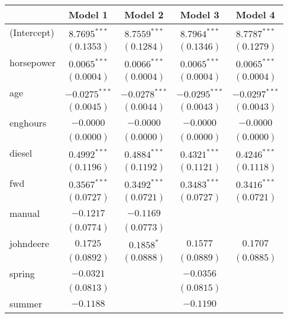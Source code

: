 
\begin{table}
\begin{center}
\begin{tabular}{l c c c c}
\hline
 & Model 1 & Model 2 & Model 3 & Model 4 \\
\hline
(Intercept) & $8.7695^{***}$  & $8.7559^{***}$  & $8.7964^{***}$  & $8.7787^{***}$  \\
            & $(0.1353)$      & $(0.1284)$      & $(0.1346)$      & $(0.1279)$      \\
horsepower  & $0.0065^{***}$  & $0.0066^{***}$  & $0.0065^{***}$  & $0.0065^{***}$  \\
            & $(0.0004)$      & $(0.0004)$      & $(0.0004)$      & $(0.0004)$      \\
age         & $-0.0275^{***}$ & $-0.0278^{***}$ & $-0.0295^{***}$ & $-0.0297^{***}$ \\
            & $(0.0045)$      & $(0.0044)$      & $(0.0043)$      & $(0.0043)$      \\
enghours    & $-0.0000$       & $-0.0000$       & $-0.0000$       & $-0.0000$       \\
            & $(0.0000)$      & $(0.0000)$      & $(0.0000)$      & $(0.0000)$      \\
diesel      & $0.4992^{***}$  & $0.4884^{***}$  & $0.4321^{***}$  & $0.4246^{***}$  \\
            & $(0.1196)$      & $(0.1192)$      & $(0.1121)$      & $(0.1118)$      \\
fwd         & $0.3567^{***}$  & $0.3492^{***}$  & $0.3483^{***}$  & $0.3416^{***}$  \\
            & $(0.0727)$      & $(0.0721)$      & $(0.0727)$      & $(0.0721)$      \\
manual      & $-0.1217$       & $-0.1169$       &                 &                 \\
            & $(0.0774)$      & $(0.0773)$      &                 &                 \\
johndeere   & $0.1725$        & $0.1858^{*}$    & $0.1577$        & $0.1707$        \\
            & $(0.0892)$      & $(0.0888)$      & $(0.0889)$      & $(0.0885)$      \\
spring      & $-0.0321$       &                 & $-0.0356$       &                 \\
            & $(0.0813)$      &                 & $(0.0815)$      &                 \\
summer      & $-0.1188$       &                 & $-0.1190$       &                 \\

\end{tabular}
\end{center}
\end{table}
